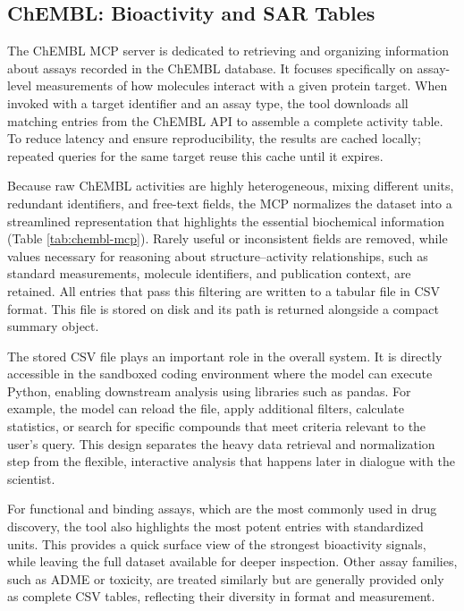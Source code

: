 \documentclass{article}
\begin{document}
\subsection{ChEMBL: Bioactivity and SAR Tables}\label{sec:data:chembl}
The ChEMBL MCP server is dedicated to retrieving and organizing information about assays recorded in the ChEMBL database. It focuses specifically on assay-level measurements of how molecules interact with a given protein target. When invoked with a target identifier and an assay type, the tool downloads all matching entries from the ChEMBL API to assemble a complete activity table. To reduce latency and ensure reproducibility, the results are cached locally; repeated queries for the same target reuse this cache until it expires.

Because raw ChEMBL activities are highly heterogeneous, mixing different units, redundant identifiers, and free-text fields, the MCP normalizes the dataset into a streamlined representation that highlights the essential biochemical information (Table \ref{tab:chembl-mcp}). Rarely useful or inconsistent fields are removed, while values necessary for reasoning about structure–activity relationships, such as standard measurements, molecule identifiers, and publication context, are retained. All entries that pass this filtering are written to a tabular file in CSV format. This file is stored on disk and its path is returned alongside a compact summary object.

The stored CSV file plays an important role in the overall system. It is directly accessible in the sandboxed coding environment where the model can execute Python, enabling downstream analysis using libraries such as pandas. For example, the model can reload the file, apply additional filters, calculate statistics, or search for specific compounds that meet criteria relevant to the user’s query. This design separates the heavy data retrieval and normalization step from the flexible, interactive analysis that happens later in dialogue with the scientist.

For functional and binding assays, which are the most commonly used in drug discovery, the tool also highlights the most potent entries with standardized units. This provides a quick surface view of the strongest bioactivity signals, while leaving the full dataset available for deeper inspection. Other assay families, such as ADME or toxicity, are treated similarly but are generally provided only as complete CSV tables, reflecting their diversity in format and measurement.
\end{document}

